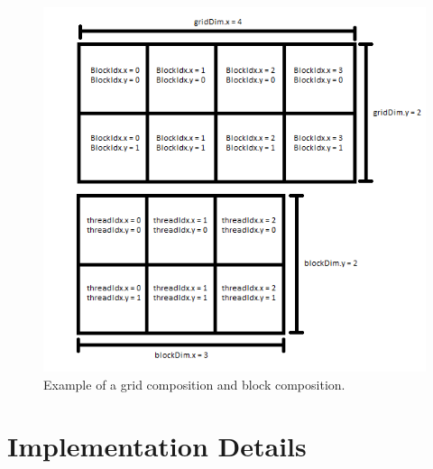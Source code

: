 \documentclass[conference]{IEEEtran}
\begin{document}
\begin{figure}[htbp]
	\centerline{\includegraphics[width=\linewidth]{figures/gridExampleTransparant.png}}
	\caption{Example of a grid composition and block composition.}
	\label{fig1}
\end{figure}

\section{Implementation Details}
\end{document}
